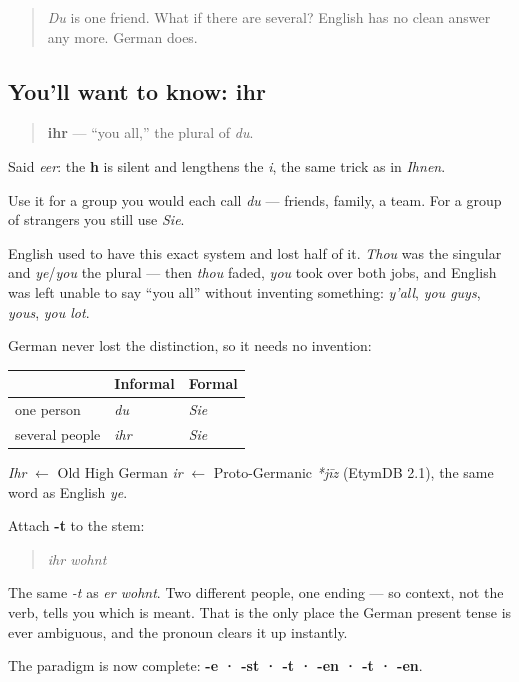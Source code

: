 \label{lesson:GE-C05-ihr}



\begin{quote}
\emph{Du} is one friend. What if there are several? English has no clean answer any more. German does.
\end{quote}

\subsection*{You'll want to know: ihr}
\begin{quote}
\textbf{ihr} — \textquotedblleft{}you all,\textquotedblright{} the plural of \emph{du}.
\end{quote}

Said \emph{eer}: the \textbf{h} is silent and lengthens the \emph{i}, the same trick as in \emph{Ihnen}.

Use it for a group you would each call \emph{du} — friends, family, a team. For a group of strangers you still use \emph{Sie}.

\begin{cousinweb}
English used to have this exact system and lost half of it. \emph{Thou} was the singular and \emph{ye}/\emph{you} the plural — then \emph{thou} faded, \emph{you} took over both jobs, and English was left unable to say \textquotedblleft{}you all\textquotedblright{} without inventing something: \emph{y'all}, \emph{you guys}, \emph{yous}, \emph{you lot}.

German never lost the distinction, so it needs no invention:

\noindent
\begin{tabularx}{\linewidth}{@{}>{\raggedright\arraybackslash}X>{\raggedright\arraybackslash}X>{\raggedright\arraybackslash}X@{}}
\toprule
\textbf{} & \textbf{Informal} & \textbf{Formal} \\
\midrule
one person & \emph{du} & \emph{Sie} \\
several people & \emph{ihr} & \emph{Sie} \\
\bottomrule
\end{tabularx}

\emph{Ihr} $\leftarrow$ Old High German \emph{ir} $\leftarrow$ Proto-Germanic \emph{*jīz} (EtymDB 2.1), the same word as English \emph{ye}.
\end{cousinweb}

\begin{grammarlens}[title={Grammar Lens: ihr takes -t}]
Attach \textbf{-t} to the stem:

\begin{quote}
\emph{ihr wohnt}
\end{quote}

The same \emph{-t} as \emph{er wohnt}. Two different people, one ending — so context, not the verb, tells you which is meant. That is the only place the German present tense is ever ambiguous, and the pronoun clears it up instantly.

The paradigm is now complete: \textbf{-e · -st · -t · -en · -t · -en}.
\end{grammarlens}

